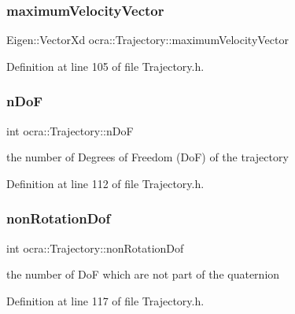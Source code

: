 \subsubsection{\texorpdfstring{maximum\+Velocity\+Vector}{maximumVelocityVector}}
{\footnotesize\ttfamily Eigen\+::\+Vector\+Xd ocra\+::\+Trajectory\+::maximum\+Velocity\+Vector\hspace{0.3cm}{\ttfamily [protected]}}



Definition at line 105 of file Trajectory.\+h.

\hypertarget{classocra_1_1Trajectory_a6c5df48ec92b0a64dc39091bc0c17199}{}\label{classocra_1_1Trajectory_a6c5df48ec92b0a64dc39091bc0c17199} 
\subsubsection{\texorpdfstring{n\+DoF}{nDoF}}
{\footnotesize\ttfamily int ocra\+::\+Trajectory\+::n\+DoF\hspace{0.3cm}{\ttfamily [protected]}}

the number of Degrees of Freedom (DoF) of the trajectory 

Definition at line 112 of file Trajectory.\+h.

\hypertarget{classocra_1_1Trajectory_a6ea59dbc9549f00f95a05581dea36415}{}\label{classocra_1_1Trajectory_a6ea59dbc9549f00f95a05581dea36415} 
\subsubsection{\texorpdfstring{non\+Rotation\+Dof}{nonRotationDof}}
{\footnotesize\ttfamily int ocra\+::\+Trajectory\+::non\+Rotation\+Dof\hspace{0.3cm}{\ttfamily [protected]}}

the number of DoF which are not part of the quaternion 

Definition at line 117 of file Trajectory.\+h.

\hypertarget{classocra_1_1Trajectory_a233933b988029ac1a6ae24b58e59bf3e}{}\label{classocra_1_1Trajectory_a233933b988029ac1a6ae24b58e59bf3e} 
